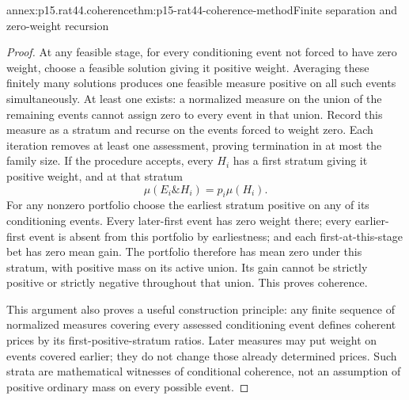 \begin{annexitem}{annex:p15.rat44.coherence}{thm:p15-rat44-coherence-method}{Finite separation and zero-weight recursion}
\begin{proof}
At any feasible stage, for every conditioning event not forced to have
zero weight, choose a feasible solution giving it positive weight.
Averaging these finitely many solutions produces one feasible measure
positive on all such events simultaneously. At least one exists: a
normalized measure on the union of the remaining events cannot assign
zero to every event in that union. Record this measure as a stratum
and recurse on the events forced to weight zero. Each iteration removes
at least one assessment, proving termination in at most the family size.
If the procedure accepts, every \(H_i\) has a first stratum giving
it positive weight, and at that stratum
\[
 \mu(E_i\mathbin{\&}H_i)=p_i\mu(H_i).
\]
For any nonzero portfolio choose the earliest stratum positive on any
of its conditioning events. Every later-first event has zero weight
there; every earlier-first event is absent from this portfolio by
earliestness; and each first-at-this-stage bet has zero mean gain.
The portfolio therefore has mean zero under this stratum, with
positive mass on its active union. Its gain cannot be strictly positive
or strictly negative throughout that union. This proves coherence.

This argument also proves a useful construction principle: any finite
sequence of normalized measures covering every assessed conditioning
event defines coherent prices by its first-positive-stratum ratios.
Later measures may put weight on events covered earlier; they do not
change those already determined prices. Such strata are mathematical
witnesses of conditional coherence, not an assumption of positive
ordinary mass on every possible event.
\end{proof}
\end{annexitem}

